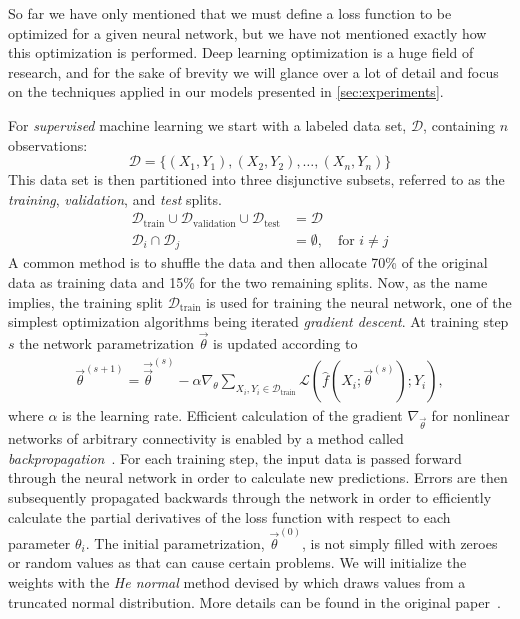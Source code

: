 So far we have only mentioned that we must define a loss function to be optimized for a given neural network, but we have not mentioned exactly how this optimization is performed.
Deep learning optimization is a huge field of research, and for the sake of brevity we will glance over a lot of detail and focus on the techniques applied in our models presented in \cref{sec:experiments}.

For \textit{supervised} machine learning we start with a labeled data set, $\mathcal{D}$, containing $n$ observations:
%
\begin{equation*}
  \mathcal{D} = \{(X_1, Y_1), (X_2, Y_2), \ldots, (X_n, Y_n)\}
\end{equation*}
%
This data set is then partitioned into three disjunctive subsets, referred to as the \textit{training}, \textit{validation}, and \textit{test} splits.
%
\begin{align*}
  \mathcal{D}_{\mathrm{train}} \cup \mathcal{D}_{\mathrm{validation}} \cup \mathcal{D}_{\mathrm{test}} &= \mathcal{D}\\
  \mathcal{D}_i \cap \mathcal{D}_j &= \emptyset,~~~\text{ for } i \neq j
\end{align*}
%
A common method is to shuffle the data and then allocate 70\% of the original data as training data and 15\% for the two remaining splits.
Now, as the name implies, the training split $\mathcal{D}_{\mathrm{train}}$ is used for training the neural network, one of the simplest optimization algorithms being iterated \textit{gradient descent}.
At training step $s$ the network parametrization $\vec{\theta}$ is updated according to
%
\begin{align*}
  \vec{\theta}^{(s + 1)}
  =
    \vec{\vec{\theta}}^{(s)}
    -
    \alpha \nabla_{\theta}
      \sum_{X_i, Y_i \in \mathcal{D}_{\mathrm{train}}}
      \mathcal{L}(\hat{f}(X_i; \vec{\theta}^{(s)}); Y_i)
  ,
\end{align*}
%
where $\alpha$ is the learning rate.
Efficient calculation of the gradient $\nabla_{\vec{\theta}}$ for nonlinear networks of arbitrary connectivity is enabled by a method called \textit{backpropagation}~\cite{backpropagation}.
For each training step, the input data is passed forward through the neural network in order to calculate new predictions.
Errors are then subsequently propagated backwards through the network in order to efficiently calculate the partial derivatives of the loss function with respect to each parameter $\theta_i$.
The initial parametrization, $\vec{\theta}^{(0)}$, is not simply filled with zeroes or random values as that can cause certain problems.
We will initialize the weights with the \textit{He normal} method devised by \citeauthor{he-normal} which draws values from a truncated normal distribution.
More details can be found in the original paper~\cite{he-normal}.


